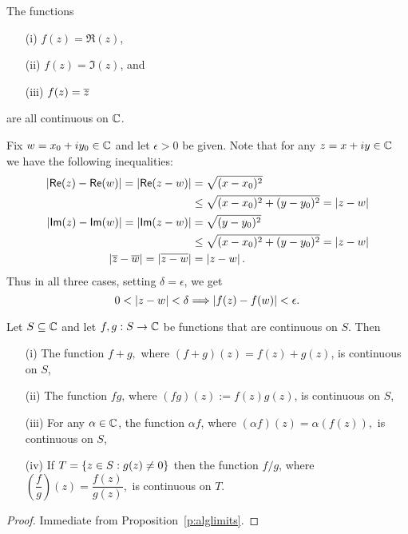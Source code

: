 \begin{example}
\label{e:cts}

The functions
\begin{enumerate}
\item[(i)] $f(z) = \Re (z)$,
\item[(ii)] $f(z) = \Im (z)$, and
\item[(iii)] $f(z) = \overline{z}$
\end{enumerate}
are all continuous on $\mathbb{C}$.
\end{example}

\begin{solution}
Fix $w=x_0+iy_0 \in \mathbb{C}$ and let $\epsilon>0$ be given.  Note that for any $z=x+iy \in \mathbb{C}$ we have the following inequalities:
\begin{align*}
\left|  \textsf{Re} (z) - \textsf{Re} (w) \right| = \left| \textsf{Re} (z-w) \right| & = \sqrt{(x-x_0)^2} \\
&\leq \sqrt{(x-x_0)^2+(y-y_0)^2} = \left| z-w \right| \\
\left|  \textsf{Im} (z) - \textsf{Im} (w) \right| = \left| \textsf{Im} (z-w) \right| & = \sqrt{(y-y_0)^2} \\
&\leq \sqrt{(x-x_0)^2+(y-y_0)^2} = \left| z-w \right| \\
\left| \overline{z}-\overline{w} \right| = \left| \overline{z-w} \right| & = \left| z-w \right|.
\end{align*}
Thus in all three cases, setting $\delta=\epsilon$, we get
\[
0< \left| z-w \right| < \delta \Longrightarrow \left| f(z)-f(w) \right| < \epsilon.
\]
\end{solution}



\begin{proposition}
\label{t:continuity}
Let $S \subseteq \mathbb{C}$ and let $f,g:S \to \mathbb{C}$ be functions that are continuous on $S$.  Then
\begin{enumerate}
\item[(i)] The function $f+g,$ where $(f+g)(z)=f(z)+g(z)$, is continuous on $S$,
\item[(ii)] The function $fg$, where $(fg)(z):=f(z)g(z)$, is continuous on $S$,
\item[(iii)] For any $\alpha \in \mathbb{C}$, the function $\alpha f$, where $(\alpha f)(z)=\alpha \left( f(z) \right),$ is continuous on $S$,
\item[(iv)] If $T=\left\{z \in S: g(z) \neq 0 \right\}$ then the function $ f/g$, where $ \left( \dfrac{f}{g} \right) (z)= \dfrac{f(z)}{g(z)},$ is continuous on $T$.
\end{enumerate}
\end{proposition}
\begin{proof}
Immediate from Proposition~\ref{p:alglimits}.
\end{proof}

